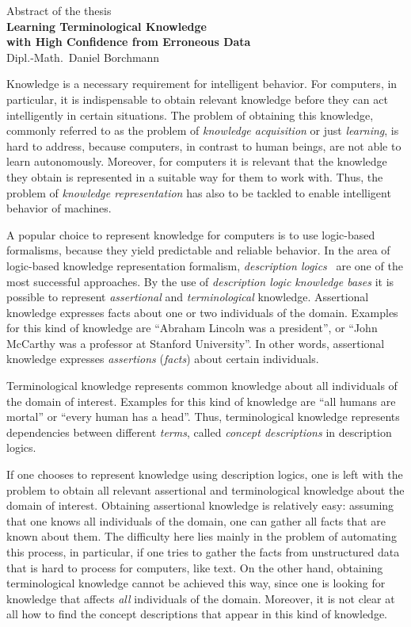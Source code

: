 \documentclass[english,fleqn]{scrartcl}
\begin{document}
\medskip
\begin{center}
  \normalsize Abstract of the thesis\\
  \LARGE\textbf{Learning Terminological Knowledge\\ with High Confidence from Erroneous
    Data}\\
  \bigskip%
  \large Dipl.-Math.\ Daniel Borchmann
\end{center}
\bigskip
\bigskip

\noindent
Knowledge is a necessary requirement for intelligent behavior.  For computers, in
particular, it is indispensable to obtain relevant knowledge before they can act
intelligently in certain situations.  The problem of obtaining this knowledge, commonly
referred to as the problem of \emph{knowledge acquisition} or just \emph{learning}, is
hard to address, because computers, in contrast to human beings, are not able to learn
autonomously.  Moreover, for computers it is relevant that the knowledge they obtain is
represented in a suitable way for them to work with.  Thus, the problem of \emph{knowledge
  representation} has also to be tackled to enable intelligent behavior of machines.

A popular choice to represent knowledge for computers is to use logic-based formalisms,
because they yield predictable and reliable behavior.  In the area of logic-based
knowledge representation formalism, \emph{description logics}~\cite{DLhandbook} are one of
the most successful approaches.  By the use of \emph{description logic knowledge bases} it
is possible to represent \emph{assertional} and \emph{terminological} knowledge.
Assertional knowledge expresses facts about one or two individuals of the domain.
Examples for this kind of knowledge are \enquote{Abraham Lincoln was a president}, or
\enquote{John McCarthy was a professor at Stanford University}.  In other words,
assertional knowledge expresses \emph{assertions} (\emph{facts}) about certain
individuals.

Terminological knowledge represents common knowledge about all individuals of the domain
of interest.  Examples for this kind of knowledge are \enquote{all humans are mortal} or
\enquote{every human has a head}.  Thus, terminological knowledge represents dependencies
between different \emph{terms}, called \emph{concept descriptions} in description logics.

If one chooses to represent knowledge using description logics, one is left with the
problem to obtain all relevant assertional and terminological knowledge about the domain
of interest.  Obtaining assertional knowledge is relatively easy: assuming that one knows
all individuals of the domain, one can gather all facts that are known about them.  The
difficulty here lies mainly in the problem of automating this process, in particular, if
one tries to gather the facts from unstructured data that is hard to process for
computers, like text.  On the other hand, obtaining terminological knowledge cannot be
achieved this way, since one is looking for knowledge that affects \emph{all} individuals
of the domain.  Moreover, it is not clear at all how to find the concept descriptions that
appear in this kind of knowledge.
\end{document}
